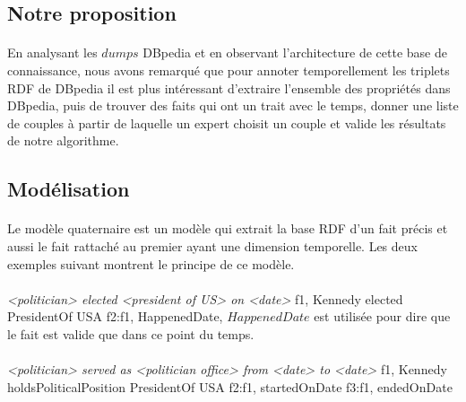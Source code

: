 \subsection{Notre proposition}
\paragraph{}
En analysant les $dumps$ DBpedia et en observant l'architecture de cette base de connaissance, nous avons remarqué que pour annoter temporellement les triplets RDF de DBpedia il est plus intéressant d'extraire l'ensemble des propriétés dans DBpedia, puis de trouver des faits qui ont un trait avec le temps, donner une liste de couples à partir de laquelle un expert choisit un couple et valide les résultats de notre algorithme.
\subsection{Modélisation}
\paragraph{}
Le modèle quaternaire est un modèle qui extrait la base RDF d'un fait précis et aussi le fait rattaché au premier ayant une dimension temporelle. Les deux exemples suivant montrent le principe de ce modèle.
\paragraph{}
{\it <politician> elected <president of US> on <date>}
\newline
f1, Kennedy elected PresidentOf USA 
\newline
f2:f1, HappenedDate, $HappenedDate$ est utilisée pour dire que le fait est valide que dans ce point du temps.
\paragraph{}
{\it <politician> served as <politician office> from <date> to <date>}
\newline
f1, Kennedy holdsPoliticalPosition PresidentOf USA 
\newline
f2:f1, startedOnDate 
\newline
f3:f1, endedOnDate

